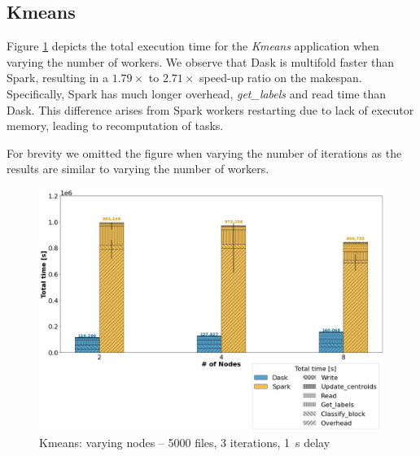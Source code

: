\documentclass[AMA,STIX1COL]{WileyNJD-v2}
\begin{document}
\subsection{Kmeans}
Figure \ref{fig:kmeans_worker} depicts the total execution time for the \textit{Kmeans} application when varying the number of workers.
We observe that Dask is multifold faster than Spark, resulting in a $1.79\times$ to $2.71\times$ speed-up ratio on the makespan.
Specifically, Spark has much longer overhead, \textit{get\_labels} and read time than Dask.
This difference arises from Spark workers restarting due to lack of executor memory, leading to recomputation of tasks.
		
For brevity we omitted the figure when varying the number of iterations as the results are similar to varying the number of workers.
\begin{figure}[!h]
	\centering
	\includegraphics[clip,width=0.75\columnwidth]{figures/stacked_kmeans_worker.jpg}
	\caption{Kmeans: varying nodes -- 5000 files, 3 iterations, \SI{1}{\second} delay}
	\label{fig:kmeans_worker}
\end{figure}
		
\end{document}
